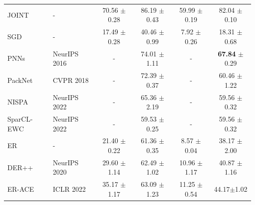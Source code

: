 \documentclass[10pt]{article} %
\begin{document}
\begin{table}[t]
{\begin{tabular}{l|l|cc|cc}
   \midrule
    JOINT   & - & 70.56 $\pm$0.28 & 86.19 $\pm$0.43 & 59.99 $\pm$0.19 & 82.04 $\pm$0.10 \\
    SGD  & -  & 17.49 $\pm$0.28 & 40.46 $\pm$0.99 & 7.92 $\pm$0.26 & 18.31 $\pm$0.68 \\ \midrule
    PNNs \citep{rusu2016progressive} & NeurIPS 2016 & - & 74.01 $\pm$1.11 & - & \textbf{67.84} $\pm$0.29 \\
    PackNet \citep{mallya2018packnet} & CVPR 2018 & - &  72.39 $\pm$0.37 & - &  60.46 $\pm$1.22 \\
    NISPA \citep{gurbuz2022nispa} & NeurIPS 2022  & - &  65.36 $\pm$2.19 & - &  59.56 $\pm$0.32 \\
    SparCL-EWC \citep{wang2022sparcl} & NeurIPS 2022 & - &  59.53 $\pm$0.25 & - &  59.56 $\pm$0.32 \\ \midrule
    ER   & -  & 21.40 $\pm$0.22 & 61.36 $\pm$0.35 & 8.57 $\pm$0.04 & 38.17 $\pm$2.00 \\
    DER++ \citep{buzzega2020dark}  & NeurIPS 2020  &   29.60 $\pm$1.14 & 62.49 $\pm$1.02 & 10.96 $\pm$1.17 & 40.87 $\pm$1.16 \\
    ER-ACE \citep{caccia2022new}  & ICLR 2022  & 35.17 $\pm$1.17 & 63.09 $\pm$1.23 &  11.25 $\pm$0.54  & 44.17$\pm$1.02 \\

\end{tabular}}
\end{table}
\end{document}
